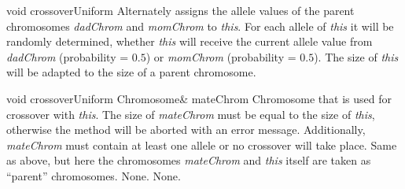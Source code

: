 \vspace*{4ex}

    \setCorrectWidthThree{8pt}
    \printMethodWithParamsSaved
        {void}
        {}
        {crossoverUniform}
        {Alternately assigns the allele values of the parent chromosomes
{\em dadChrom} and {\em momChrom} to {\em this}. For each allele of {\em this}
it will be randomly determined, whether {\em this} will receive the
current allele value from {\em dadChrom} (probability = $0.5$) or 
{\em momChrom} (probability = $0.5$). The size of {\em this} will
be adapted to the size of a parent chromosome.}
        {}
    \setCorrectWidthThree{4pt}

\clearpage

    \printMethodWithOneParam
    {void} 
    {crossoverUniform}
    {Chromosome\&} 
    {mateChrom} 
    {Chromosome that is used for crossover with {\em this}.
The size of {\em mateChrom} must be equal to the size of {\em this},
otherwise the method will be aborted with an error message. Additionally,
{\em mateChrom} must contain at least one allele or no crossover will take
place.}
    {Same as above, but here the chromosomes {\em mateChrom} and {\em this}
itself are taken as ``parent'' chromosomes.}
    {None.}
    {None.}

\vspace*{4ex}

